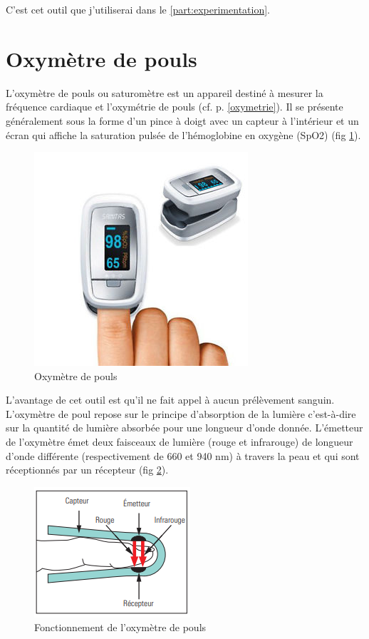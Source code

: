     C'est cet outil que j'utiliserai dans le \autoref{part:experimentation}.\\
    
    
    \section{Oxymètre de pouls}

    L'oxymètre de pouls ou saturomètre est un appareil destiné à mesurer la fréquence cardiaque et l'oxymétrie de pouls (cf. p.\pageref{oxymetrie}  \ref{oxymetrie}). Il se présente généralement sous la forme d'un pince à doigt avec un capteur à l'intérieur et un écran qui affiche la saturation pulsée de l’hémoglobine en oxygène (SpO2) (fig \ref{fig:oxymetre}).
    
    \begin{figure}[H]
        \centering
        \includegraphics[scale=0.55]{images/oxymetre2.jpg}\hfill
        \caption{\label{fig:oxymetre}Oxymètre de pouls}
    \end{figure}
    
    L'avantage de cet outil est qu'il ne fait appel à aucun prélèvement sanguin.\\
    
    L'oxymètre de poul repose sur le principe d'absorption de la lumière c'est-à-dire sur la quantité de lumière absorbée pour une longueur d'onde donnée.
    L'émetteur de l'oxymètre émet deux faisceaux de lumière (rouge et infrarouge) de longueur d'onde différente (respectivement de 660 et 940 nm) à travers la peau et qui sont réceptionnés par un récepteur (fig \ref{fig:oxymetre_fonctionnement}).
    
     \begin{figure}[H]
        \centering
        \includegraphics[scale=1]{images/oxymetre3.jpg}
        \caption{\label{fig:oxymetre_fonctionnement}Fonctionnement de l'oxymètre de pouls}
    \end{figure}
    
